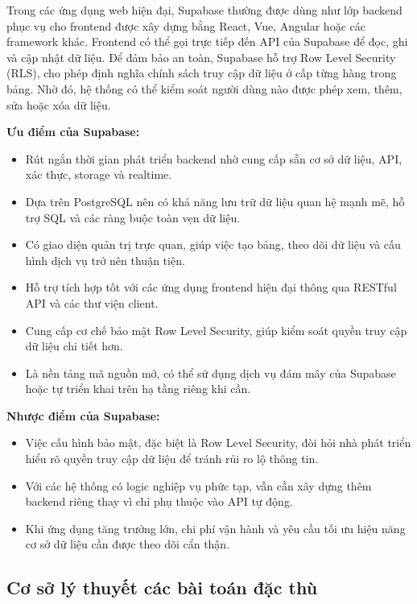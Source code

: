 Trong các ứng dụng web hiện đại, Supabase thường được dùng như lớp backend phục vụ cho frontend được xây dựng bằng React, Vue, Angular hoặc các framework khác. Frontend có thể gọi trực tiếp đến API của Supabase để đọc, ghi và cập nhật dữ liệu. Để đảm bảo an toàn, Supabase hỗ trợ Row Level Security (RLS), cho phép định nghĩa chính sách truy cập dữ liệu ở cấp từng hàng trong bảng. Nhờ đó, hệ thống có thể kiểm soát người dùng nào được phép xem, thêm, sửa hoặc xóa dữ liệu.

\textbf{Ưu điểm của Supabase:}
\begin{itemize}
    \item Rút ngắn thời gian phát triển backend nhờ cung cấp sẵn cơ sở dữ liệu, API, xác thực, storage và realtime.
    \item Dựa trên PostgreSQL nên có khả năng lưu trữ dữ liệu quan hệ mạnh mẽ, hỗ trợ SQL và các ràng buộc toàn vẹn dữ liệu.
    \item Có giao diện quản trị trực quan, giúp việc tạo bảng, theo dõi dữ liệu và cấu hình dịch vụ trở nên thuận tiện.
    \item Hỗ trợ tích hợp tốt với các ứng dụng frontend hiện đại thông qua RESTful API và các thư viện client.
    \item Cung cấp cơ chế bảo mật Row Level Security, giúp kiểm soát quyền truy cập dữ liệu chi tiết hơn.
    \item Là nền tảng mã nguồn mở, có thể sử dụng dịch vụ đám mây của Supabase hoặc tự triển khai trên hạ tầng riêng khi cần.
\end{itemize}

\textbf{Nhược điểm của Supabase:}
\begin{itemize}
    \item Việc cấu hình bảo mật, đặc biệt là Row Level Security, đòi hỏi nhà phát triển hiểu rõ quyền truy cập dữ liệu để tránh rủi ro lộ thông tin.
    \item Với các hệ thống có logic nghiệp vụ phức tạp, vẫn cần xây dựng thêm backend riêng thay vì chỉ phụ thuộc vào API tự động.
    \item Khi ứng dụng tăng trưởng lớn, chi phí vận hành và yêu cầu tối ưu hiệu năng cơ sở dữ liệu cần được theo dõi cẩn thận.
\end{itemize}

\subsection{Cơ sở lý thuyết các bài toán đặc thù}

